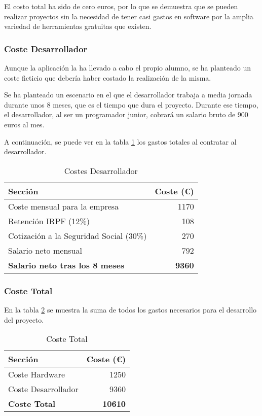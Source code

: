 El costo total ha sido de cero euros, por lo que se demuestra que se pueden realizar proyectos sin la necesidad de tener casi gastos en software por la amplia variedad de herramientas gratuitas que existen.


\subsubsection{Coste Desarrollador}
Aunque la aplicación la ha llevado a cabo el propio alumno, se ha planteado un coste ficticio que debería haber costado la realización de la misma.

Se ha planteado un escenario en el que el desarrollador trabaja a media jornada durante unos 8 meses, que es el tiempo que dura el proyecto. Durante ese tiempo, el desarrollador, al ser un programador junior, cobrará un salario bruto de 900 euros al mes.

A continuación, se puede ver en la tabla \ref{tab:CostosPersonal} los gastos totales al contratar al desarrollador.

\begin{table}[H]
\centering
\begin{tabular}{|l|r|}
\hline
\textbf{Sección} & \textbf{Coste (€)} \\ \hline
Coste mensual para la empresa & 1170 \\ \hline
Retención IRPF (12\%) & 108  \\ \hline
Cotización a la Seguridad Social (30\%) & 270 \\ \hline
Salario neto mensual & 792 \\ \hline
\textbf{Salario neto tras los 8 meses } & \textbf{9360} \\ \hline
\end{tabular}
\caption{Costes Desarrollador}
\label{tab:CostosPersonal}
\end{table}


\subsubsection{Coste Total}

En la tabla \ref{tab:CosteTotal} se muestra la suma de todos los gastos necesarios para el desarrollo del proyecto.


\begin{table}[H]
\centering
\begin{tabular}{|l|r|}
\hline
\textbf{Sección} & \textbf{Coste (€)} \\ \hline
Coste Hardware & 1250 \\ \hline
Coste Desarrollador & 9360 \\ \hline
\textbf{Coste Total} & \textbf{10610} \\ \hline
\end{tabular}
\caption{Coste Total}
\label{tab:CosteTotal}
\end{table}


